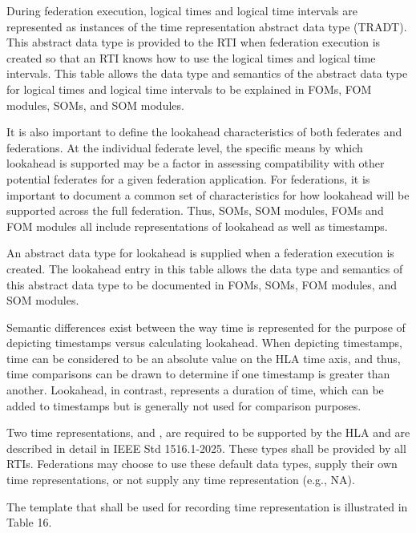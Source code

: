\documentclass{requirements-lab}
\begin{document}
During federation execution, logical times and logical time intervals are represented as instances of the time representation abstract data type (TRADT). This abstract data type is provided to the RTI when federation execution is created so that an RTI knows how to use the logical times and logical time intervals. This table allows the data type and semantics of the abstract data type for logical times and logical time intervals to be explained in FOMs, FOM modules, SOMs, and SOM modules.

It is also important to define the lookahead characteristics of both federates and federations. At the individual federate level, the specific means by which lookahead is supported may be a factor in assessing compatibility with other potential federates for a given federation application. For federations, it is important to document a common set of characteristics for how lookahead will be supported across the full federation. Thus, SOMs, SOM modules, FOMs and FOM modules all include representations of lookahead as well as timestamps.

An abstract data type for lookahead is supplied when a federation execution is created. The lookahead entry in this table allows the data type and semantics of this abstract data type to be documented in FOMs, SOMs, FOM modules, and SOM modules.

Semantic differences exist between the way time is represented for the purpose of depicting timestamps versus calculating lookahead. When depicting timestamps, time can be considered to be an absolute value on the HLA time axis, and thus, time comparisons can be drawn to determine if one timestamp is greater than another. Lookahead, in contrast, represents a duration of time, which can be added to timestamps but is generally not used for comparison purposes.

Two time representations,  and , are required to be supported by the HLA and are described in detail in IEEE Std 1516.1-2025. These types shall be provided by all RTIs. Federations may choose to use these default data types, supply their own time representations, or not supply any time representation (e.g., NA).

The template that shall be used for recording time representation is illustrated in Table 16.
\endgroup
\clearpage
\end{document}

